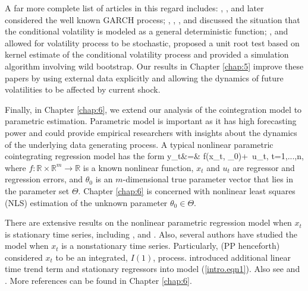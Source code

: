 A far more complete list of articles in this regard includes: \cite{kimschmidt1993}, \cite{hansenrahbek1998},  \cite{boswijk2001} and later \cite{linglimcaleer2003} considered the well known GARCH process; \cite{hamoritokihisa1997}, \cite{kimleybournenewbold2002}, \cite{cavaliere2005}, \cite{cavalieretaylor2008a} and \cite{beare2008} discussed  the situation that the conditional volatility is modeled as a general deterministic function; \cite{boswijk2005},  \cite{xu2008} and  \citet[][\citeyear{cavalieretaylor2008b}, \citeyear{cavalieretaylor2009}]{cavalieretaylor2007} allowed for volatility process to be stochastic, proposed a unit root test based on kernel estimate of the conditional volatility process and provided a simulation algorithm involving wild bootstrap. Our results in Chapter \ref{chap:5} improve these papers by using external data  explicitly and allowing the dynamics of future volatilities to be affected by current shock.


Finally, in Chapter \ref{chap:6}, we extend our analysis of the cointegration model to parametric estimation. Parametric model is important as it has high forecasting power and could provide empirical researchers with insights about the dynamics of the underlying data generating process. A typical nonlinear parametric cointegrating regression model has the form
 \be y_t&=&
f(x_t, \theta_0)+\,  u_t, \quad t=1,...,n,
\ee
where  $f:\mathbb{R} \times \mathbb{R}^m \rightarrow \mathbb{R}$ is a known nonlinear function,
$x_t$ and  $u_t$ are regressor and regression errors, and   $\theta_0$ is an $m$-dimensional true parameter vector that lies in the parameter set $\Theta$. Chapter \ref{chap:6} is concerned with nonlinear least squares (NLS) estimation of the unknown parameter $\theta_0 \in \Theta$.

 There are extensive results on the nonlinear parametric regression model when $x_t$ is stationary time series, including \cite{jennrich1969}, \cite{malinvaud1970} and \cite{wu1981}. Also, several authors have studied the model when $x_t$ is a nonstationary time series. Particularly, \cite{parkphillips2001} (PP henceforth) considered $x_t$ to be an integrated, $I(1)$, process. \cite{changparkphillips2001} introduced additional linear time trend term and stationary regressors into model (\ref{intro.eqn1}). Also see \cite{changpark2010} and \cite{shiphillips2010}. More references can be found in Chapter \ref{chap:6}.

